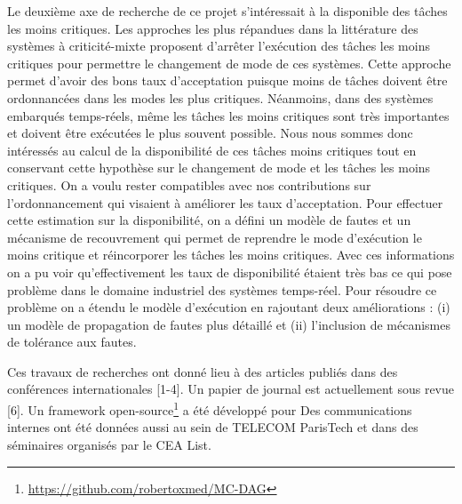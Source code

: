 \documentclass{article}
\begin{document}
Le deuxième axe de recherche de ce projet s'intéressait à la disponible des tâches les moins critiques. Les 
approches les plus répandues dans la littérature des systèmes à criticité-mixte proposent d'arrêter 
l'exécution des tâches les moins critiques pour permettre le changement de mode de ces systèmes. Cette 
approche permet d'avoir des bons taux d'acceptation puisque moins de tâches doivent être ordonnancées 
dans les modes les plus critiques. Néanmoins, dans des systèmes embarqués temps-réels, même les tâches 
les 
moins critiques sont très 
importantes et doivent être exécutées le plus souvent possible. Nous nous sommes donc intéressés au calcul 
de la disponibilité de ces tâches moins critiques tout en conservant cette hypothèse sur le changement de 
mode et les tâches les moins critiques. On a voulu rester compatibles avec nos contributions sur 
l'ordonnancement qui visaient à améliorer les taux d'acceptation. Pour effectuer cette estimation sur la 
disponibilité, on a défini un modèle de fautes et un mécanisme de recouvrement qui permet de reprendre le 
mode d'exécution le moins critique et réincorporer les tâches les moins critiques. Avec ces informations on a 
pu voir qu'effectivement les taux de disponibilité étaient très bas ce qui pose problème dans le domaine 
industriel des systèmes temps-réel. Pour résoudre ce problème on a étendu le modèle d'exécution en 
rajoutant deux améliorations : (i) un modèle de propagation de fautes plus détaillé et (ii) l'inclusion de 
mécanismes de tolérance aux fautes.


\vspace{.5cm}
Ces travaux de recherches ont donné lieu à des articles publiés dans des conférences internationales [1-4]. 
Un papier de journal est actuellement sous revue [6]. Un framework 
open-source\footnote{\url{https://github.com/robertoxmed/MC-DAG}} a été développé pour Des 
communications internes ont été données aussi au 
sein de TELECOM ParisTech et dans des séminaires organisés par le CEA List.
\end{document}
